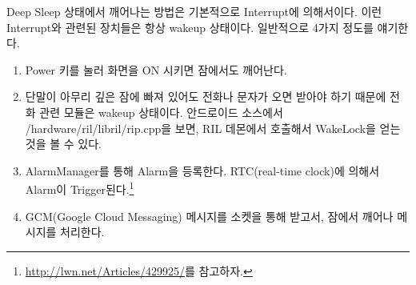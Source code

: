 
Deep Sleep 상태에서 깨어나는 방법은 기본적으로 Interrupt에 의해서이다. 
이런 Interrupt와 관련된 장치들은 항상 wakeup 상태이다.
일반적으로 4가지 정도를 얘기한다. 
\begin{enumerate}
\item Power 키를 눌러 화면을 ON 시키면 잠에서도 깨어난다.
\item 단말이 아무리 깊은 잠에 빠져 있어도 전화나 문자가 오면 받아야 하기 때문에 전화 관련 모듈은 wakeup 상태이다. 안드로이드 소스에서 /hardware/ril/libril/rip.cpp을 보면, RIL 데몬에서 호출해서 WakeLock을 얻는 것을 볼 수 있다.
\item AlarmManager를 통해 Alarm을 등록한다. RTC(real-time clock)에 의해서 Alarm이 Trigger된다.\footnote{\url{http://lwn.net/Articles/429925/}를 참고하자.}
\item GCM(Google Cloud Messaging) 메시지를 소켓을 통해 받고서, 잠에서 깨어나 메시지를 처리한다.
\end{enumerate}
 

